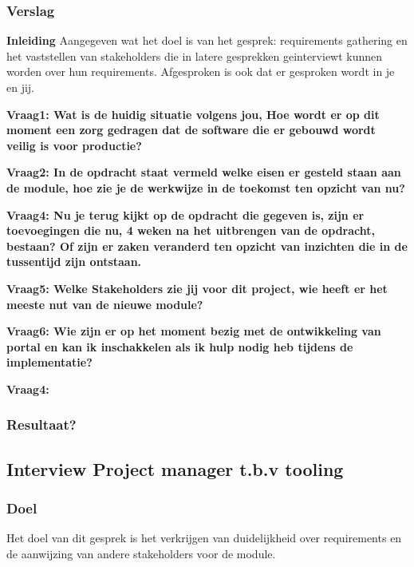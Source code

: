 \subsubsection{Verslag}
\textbf{Inleiding}
Aangegeven wat het doel is van het gesprek: requirements gathering en het vaststellen van stakeholders die in latere gesprekken geinterviewt kunnen worden over hun requirements. Afgesproken is ook dat er gesproken wordt in je en jij.

\bigskip

\textbf{Vraag1: Wat is de huidig situatie volgens jou, Hoe wordt er op dit moment een zorg gedragen dat de software die er gebouwd wordt veilig is voor productie?}

\lipsum[01]
\bigskip

\textbf{Vraag2: In de opdracht staat vermeld welke eisen er gesteld staan aan de module, hoe zie je de werkwijze in de toekomst ten opzicht van nu?}

\lipsum[03]
\bigskip

\textbf{Vraag4: Nu je terug kijkt op de opdracht die gegeven is, zijn er toevoegingen die nu, 4 weken na het uitbrengen van de opdracht, bestaan? Of zijn er zaken veranderd ten opzicht van inzichten die in de tussentijd zijn ontstaan.}

\lipsum[05]
\bigskip

\textbf{Vraag5: Welke Stakeholders zie jij voor dit project, wie heeft er het meeste nut van de nieuwe module? }

\lipsum[06]
\bigskip

\textbf{Vraag6: Wie zijn er op het moment bezig met de ontwikkeling van portal en kan ik inschakkelen als ik hulp nodig heb tijdens de implementatie?}

\lipsum[09]
\bigskip

\textbf{Vraag4: }

\lipsum[07]

\subsubsection{Resultaat?}

\subsection{Interview Project manager t.b.v tooling}

\subsubsection{Doel}
Het doel van dit gesprek is het verkrijgen van duidelijkheid over requirements en de aanwijzing van andere stakeholders voor de module.

